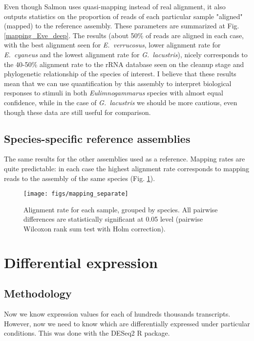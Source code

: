 \documentclass[12pt]{article}
\begin{document}
Even though Salmon uses quasi-mapping instead of real alignment, it also outputs statistics on the proportion of reads of each particular sample "aligned" (mapped) to the reference assembly. These parameters are summarized at Fig. \ref{mapping_Eve_deep}. The results (about 50\% of reads are aligned in each case, with the best alignment seen for \textit{E.~verrucosus}, lower alignment rate for \textit{E.~cyaneus} and the lowest alignment rate for \textit{G.~lacustris}), nicely corresponds to the 40-50\% alignment rate to the rRNA database seen on the cleanup stage and phylogenetic relationship of the species of interest. I believe that these results mean that we can use quantification by this assembly to interpret biological responses to stimuli in both \textit{Eulimnogammarus} species with almost equal confidence, while in the case of \textit{G.~lacustris} we should be more cautious, even though these data are still useful for comparison. 


\subsection{Species-specific reference assemblies}


The same results for the other assemblies used as a reference. Mapping rates are quite predictable: in each case the highest alignment rate corresponds to mapping reads to the assembly of the same species (Fig. \ref{mapping_separate}).


\begin{figure}[H]
\noindent \texttt{[image: figs/mapping\_separate]}
\caption{Alignment rate for each sample, grouped by species. All pairwise differences are statistically significant at 0.05 level (pairwise Wilcoxon rank sum test with Holm correction).}
\label{mapping_separate}
\end{figure}


\section{Differential expression}

\subsection{Methodology}

Now we know expression values for each of hundreds thousands transcripts. However, now we need to know which are differentially expressed under particular conditions. This was done with the DESeq2 R package.
\end{document}
